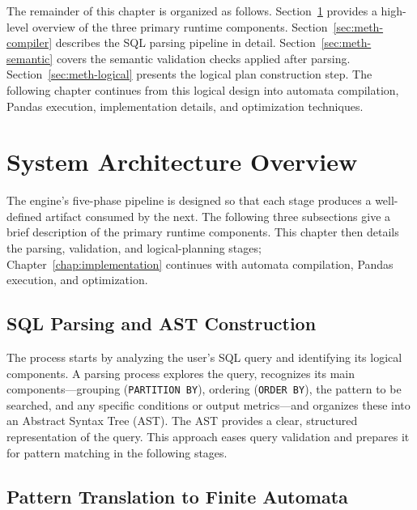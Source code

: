 The remainder of this chapter is organized as follows.
Section~\ref{sec:meth-overview} provides a high-level overview of
the three primary runtime components.
Section~\ref{sec:meth-compiler} describes the SQL parsing pipeline
in detail.
Section~\ref{sec:meth-semantic} covers the semantic validation
checks applied after parsing.
Section~\ref{sec:meth-logical} presents the logical plan
construction step.  The following chapter continues from this
logical design into automata compilation, Pandas execution,
implementation details, and optimization techniques.

\section{System Architecture Overview}
\label{sec:meth-overview}

The engine's five-phase pipeline is designed so that each stage
produces a well-defined artifact consumed by the next.
The following three subsections give a brief description of the
primary runtime components.  This chapter then details the parsing,
validation, and logical-planning stages; Chapter~\ref{chap:implementation}
continues with automata compilation, Pandas execution, and
optimization.

\subsection{SQL Parsing and AST Construction}
\label{subsec:overview-parsing}

The process starts by analyzing the user's SQL query and identifying
its logical components.  A parsing process explores the query,
recognizes its main components---grouping (\texttt{PARTITION BY}),
ordering (\texttt{ORDER BY}), the pattern to be searched, and any
specific conditions or output metrics---and organizes these into an
Abstract Syntax Tree (AST).  The AST provides a clear, structured
representation of the query.  This approach eases query validation
and prepares it for pattern matching in the following stages.

\subsection{Pattern Translation to Finite Automata}
\label{subsec:overview-automata}

